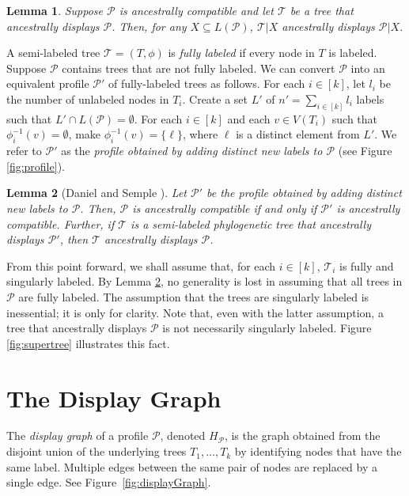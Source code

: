 \documentclass[11pt]{article}
\newcommand{\DG}{\ensuremath{H_\P}} \newcommand{\GBNT}{\ensuremath{G_{\mathtt{BNT}}}}
\renewcommand{\P}{\ensuremath{\mathcal{P}}}
\newcommand{\T}{\ensuremath{\mathcal{T}}}
\newtheorem{lemma}{Lemma}
\theoremstyle{definition}
\begin{document}
\begin{lemma}\label{lm:compatSubprofile}
Suppose $\P$ is ancestrally compatible and let $\T$ be a tree that ancestrally displays $\P$.  Then, for any $X \subseteq L(\P)$, $\T | X$ ancestrally displays $\P| X$.
\end{lemma}

A  semi-labeled tree $\T = (T, \phi)$ is \emph{fully labeled} if every node in $T$ is labeled.  Suppose $\P$ contains trees that are not fully labeled.  We can convert $\P$ into an equivalent profile $\P'$ of fully-labeled trees as follows.  For each $i \in [k]$, let $l_i$ be the number of unlabeled nodes in $T_i$.  Create a set $L'$ of $n' = \sum_{i \in [k]} l_i$ labels such that $L' \cap L(\P) = \emptyset$.  For each $i \in [k]$ and each $v \in V(T_i)$ such that $\phi_i^{-1}(v) = \emptyset$, make $\phi_i^{-1}(v) = \{\ell\}$, where $\ell$ is a distinct element from $L'$.
We refer to $\P'$ as the \emph{profile obtained by adding distinct new labels to $\P$} (see Figure \ref{fig:profile}).


\begin{lemma}[Daniel and Semple \cite{DanielSemple2004}]\label{lm:fullyL}
Let $\P'$ be the profile obtained by adding distinct new labels to $\P$. Then, $\P$ is ancestrally compatible if and only if $\P'$ is ancestrally compatible. Further, if $\T$ is a semi-labeled phylogenetic tree that ancestrally displays $\P'$, then $\T$ ancestrally displays $\P$.
\end{lemma}

From this point forward, we shall assume that,
for each $i \in [k]$, $\T_i$ is fully and singularly labeled.
By Lemma \ref{lm:fullyL}, no generality is lost in assuming that all trees in $\P$ are fully labeled. 
The assumption that the trees are singularly labeled is inessential; it is only for clarity.  Note that, even with the latter assumption, a tree that ancestrally displays $\P$ is not necessarily singularly labeled.  Figure \ref{fig:supertree} illustrates this fact.

\section{The Display Graph}\label{sec:dispGraph}

The \emph{display graph} of a profile $\P$, denoted $\DG$, is the graph obtained from the disjoint union of the underlying trees $T_1, \dots, T_k$ by identifying nodes that have the same label. Multiple edges between the same pair of nodes are replaced by a single edge. See Figure~\ref{fig:displayGraph}. 
\end{document}
